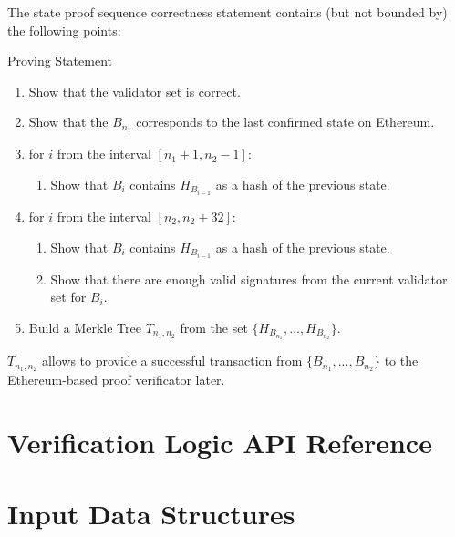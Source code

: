 The state proof sequence correctness statement contains (but not bounded by) the following points:
\begin{algorithm}
    \caption{Proving Statement}
    \label{circuit}
    \begin{enumerate}
        \item Show that the validator set is correct.
        \item Show that the $B_{n_1}$ corresponds to the last confirmed state on Ethereum.
        \item for $i$ from the interval $[n_1 + 1, n_2 - 1]$:
        \begin{enumerate}
            \item Show that $B_{i}$ contains $H_{B_{i - 1}}$ as a hash of the previous state.
        \end{enumerate}
        \item for $i$ from the interval $[n_2, n_2 + 32]$:
        \begin{enumerate}
            \item Show that $B_{i}$ contains $H_{B_{i - 1}}$ as a hash of the previous state.
            \item Show that there are enough valid signatures from the current validator set for $B_{i}$.
        \end{enumerate}
        \item Build a Merkle Tree $T_{n_1, n_2}$ from the set $\{H_{B_{n_1}}, ..., H_{B_{n_2}}\}$.
    \end{enumerate}
\end{algorithm}

$T_{n_1, n_2}$ allows to provide a successful transaction from $\{B_{n_1}, ..., B_{n_2}\}$ to the Ethereum-based proof verificator later.

\section{Verification Logic API Reference}

\section{Input Data Structures}
